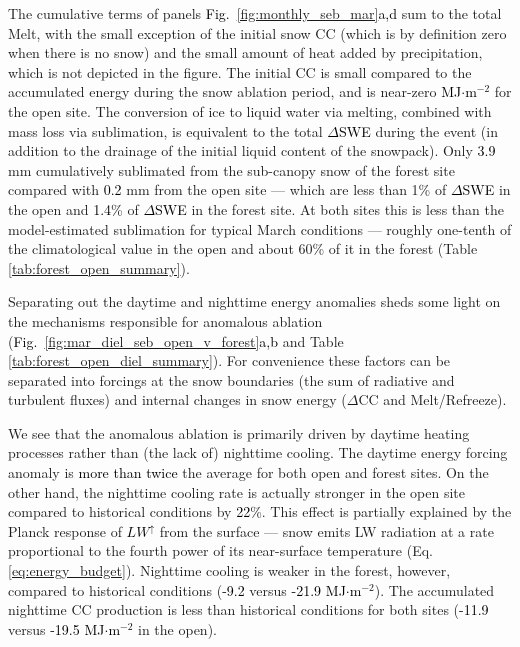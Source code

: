 \documentclass[draft]{agujournal2019}
\newcommand{\fignop}[2]{\textcolor{black}{Fig.~\ref{#1}{#2}}}  %
\newcommand{\mynum}[1]{\textcolor{black}{#1}}
\newcommand{\lwup}{\textcolor{black}{$LW^{\uparrow}$}\xspace}
\newcommand{\dswe}{\textcolor{black}{$\Delta$SWE}\xspace}
\newcommand{\mjmtwo}{\textcolor{black}{MJ$\cdot$m$^{-2}$}\xspace}
\begin{document}
The cumulative terms of panels \fignop{fig:monthly_seb_mar}{a,d} sum to the total Melt, with the small exception of the initial snow CC (which is by definition zero when there is no snow) and the small amount of heat added by precipitation, which is not depicted in the figure.
The initial CC is small compared to the accumulated energy during the snow ablation period, and is near-zero \mjmtwo for the open site.
The conversion of ice to liquid water via melting, combined with mass loss via sublimation, is equivalent to the total \dswe during the event (in addition to the drainage of the initial liquid content of the snowpack).
Only \mynum{3.9} mm cumulatively sublimated from the sub-canopy snow of the forest site compared with \mynum{0.2} mm from the open site --- which are less than 1\% of \dswe in the open and \mynum{1.4}\% of \dswe in the forest site.
At both sites this is less than the model-estimated sublimation for typical March conditions --- roughly one-tenth of the climatological value in the open and about 60\% of it in the forest (Table \ref{tab:forest_open_summary}).

Separating out the daytime and nighttime energy anomalies sheds some light on the mechanisms responsible for anomalous ablation (\fignop{fig:mar_diel_seb_open_v_forest}{a,b} and Table \ref{tab:forest_open_diel_summary}).
For convenience these factors can be separated into forcings at the snow boundaries (the sum of radiative and turbulent fluxes) and internal changes in snow energy ($\Delta$CC and Melt/Refreeze).

We see that the anomalous ablation is primarily driven by daytime heating processes rather than (the lack of) nighttime cooling.
The daytime energy forcing anomaly is \mynum{more than twice} the average for both open and forest sites. 
On the other hand, the nighttime cooling rate is actually stronger in the open site compared to historical conditions by \mynum{22}\%.
This effect is partially explained by the Planck response of \lwup from the surface --- snow emits LW radiation at a rate proportional to the fourth power of its near-surface temperature (Eq. \ref{eq:energy_budget}).
Nighttime cooling is weaker in the forest, however, compared to historical conditions (\mynum{-9.2} versus \mynum{-21.9} \mjmtwo).
The accumulated nighttime CC production is less than historical conditions for both sites (\mynum{-11.9} versus \mynum{-19.5} \mjmtwo in the open). 
\end{document}

